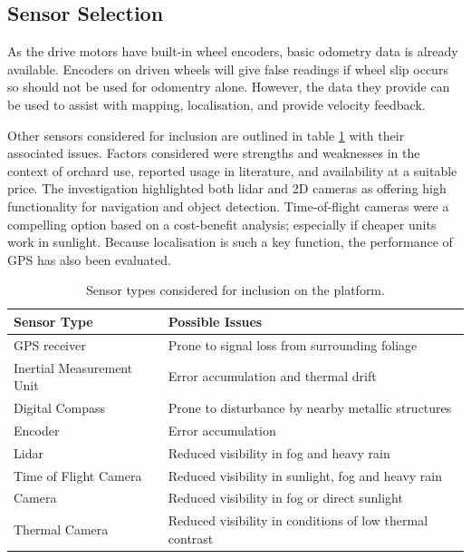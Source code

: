 \documentclass[preprint,authoryear,12pt]{elsarticle}
\begin{document}
\subsection{Sensor Selection}

    As the drive motors have built-in wheel encoders, basic odometry data is already available.
    Encoders on driven wheels will give false readings if wheel slip occurs so should not be used for odomentry alone.
    However, the data they provide can be used to assist with mapping, localisation, and provide velocity feedback.

    Other sensors considered for inclusion are outlined in table \ref{table:sensor_comparison} with their associated issues.
    Factors considered were strengths and weaknesses in the context of orchard use, reported usage in literature, and availability at a suitable price.
    The investigation highlighted both lidar and 2D cameras as offering high functionality for navigation and object detection.
    Time-of-flight cameras were a compelling option based on a cost-benefit analysis; especially if cheaper units work in sunlight.
    Because localisation is such a key function, the performance of GPS has also been evaluated.
    \begin{table}[htbp]
        \centering
        \footnotesize
        \begin{tabular}{ l l}

            \textbf{Sensor Type}      &\textbf{Possible Issues} \\ \hline
            GPS receiver              & Prone to signal loss from surrounding foliage\\  \hline
            Inertial Measurement Unit & Error accumulation and thermal drift\\ \hline
            Digital Compass           & Prone to disturbance by nearby metallic structures\\ \hline
            Encoder                   & Error accumulation \\ \hline
            Lidar                     & Reduced visibility in fog and heavy rain \\ \hline
            Time of Flight Camera     & Reduced visibility in sunlight, fog and heavy rain \\ \hline
            Camera                    & Reduced visibility in fog or direct sunlight \\ \hline
            Thermal Camera            & Reduced visibility in conditions of low thermal contrast\\ \hline
        \end{tabular}
        \caption{Sensor types considered for inclusion on the platform.}
        \label{table:sensor_comparison}
    \end{table}
\end{document}
